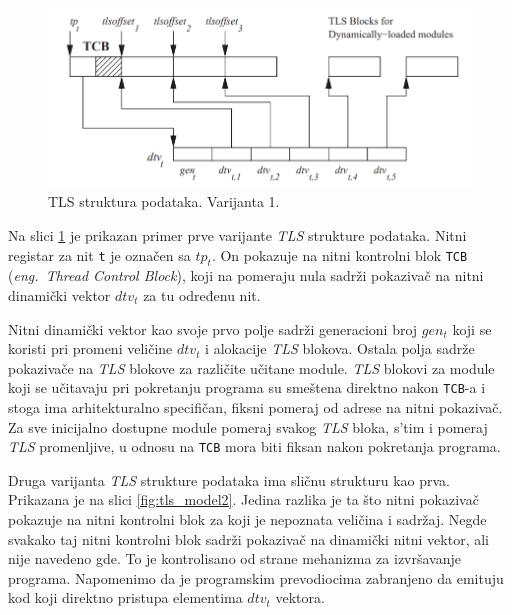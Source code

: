 \documentclass[12pt,oneside]{memoir}
\begin{document}
\begin{figure}[h!]
	\begin{center}
		\includegraphics[scale=0.6]{slike/TLSModelV1.png}
	\end{center}
	\caption{TLS struktura podataka. Varijanta 1.}
	\label{fig:tls_model1}
\end{figure}

Na slici \ref{fig:tls_model1} je prikazan primer prve varijante \emph{TLS} strukture podataka. Nitni registar za nit \texttt{t} je označen sa \texttt{$tp_t$}. On pokazuje na nitni kontrolni blok \texttt{TCB} (\emph{eng.~Thread Control Block}), koji na pomeraju nula sadrži pokazivač na nitni dinamički vektor \texttt{$dtv_t$} za tu određenu nit.

Nitni dinamički vektor kao svoje prvo polje sadrži generacioni broj \texttt{$gen_t$} koji se koristi pri promeni veličine \texttt{$dtv_t$} i alokacije \emph{TLS} blokova. Ostala polja sadrže pokazivače na \emph{TLS} blokove za različite učitane module. \emph{TLS} blokovi za module koji se učitavaju pri pokretanju programa su smeštena direktno nakon \texttt{TCB}-a i stoga ima arhitekturalno specifičan, fiksni pomeraj od adrese na nitni pokazivač. Za sve inicijalno dostupne module pomeraj svakog \emph{TLS} bloka, s'tim i pomeraj \emph{TLS} promenljive, u odnosu na \texttt{TCB} mora biti fiksan nakon pokretanja programa.

Druga varijanta \emph{TLS} strukture podataka ima sličnu strukturu kao prva. Prikazana je na slici \ref{fig:tls_model2}. Jedina razlika je ta što nitni pokazivač pokazuje na nitni kontrolni blok za koji je nepoznata veličina i sadržaj. Negde svakako taj nitni kontrolni blok sadrži pokazivač na dinamički nitni vektor, ali nije navedeno gde. To je kontrolisano od strane mehanizma za izvršavanje programa. Napomenimo da je programskim prevodiocima zabranjeno da emituju kod koji direktno pristupa elementima \texttt{$dtv_t$} vektora.
\end{document}

